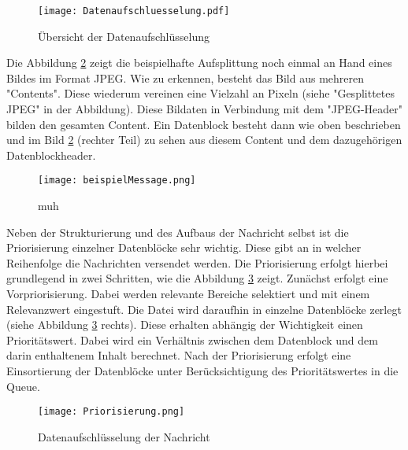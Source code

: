 \begin{figure}[H]
  \centering
  \texttt{[image: Datenaufschluesselung.pdf]}
  \caption{Übersicht der Datenaufschlüsselung}
  \label{fig:uebersichtdatenaufschlüsselung}
\end{figure}

Die Abbildung \ref{fig:beispielJPG} zeigt die beispielhafte Aufsplittung
noch einmal an Hand eines Bildes im Format JPEG. Wie zu erkennen, besteht das Bild aus
mehreren "Contents". Diese wiederum vereinen eine Vielzahl an Pixeln (siehe
"Gesplittetes JPEG" in der Abbildung). Diese Bildaten in Verbindung mit dem
"JPEG-Header" bilden den gesamten Content. Ein Datenblock besteht dann wie oben
beschrieben und im Bild \ref{fig:beispielJPG} (rechter Teil) zu sehen aus diesem
Content und dem dazugehörigen Datenblockheader.

\begin{figure}[H]
	\centering
	\texttt{[image: beispielMessage.png]}
	\caption{muh}
	\label{fig:beispielJPG}
\end{figure}

Neben der Strukturierung und des Aufbaus der Nachricht selbst ist die
Priorisierung einzelner Datenblöcke sehr wichtig. Diese gibt an in welcher
Reihenfolge die Nachrichten versendet werden. Die Priorisierung erfolgt hierbei
grundlegend in zwei Schritten, wie die Abbildung \ref{fig:priorisierungen}
zeigt.
Zunächst erfolgt eine Vorpriorisierung. Dabei werden relevante Bereiche
selektiert und mit einem Relevanzwert eingestuft. Die
Datei wird daraufhin in einzelne Datenblöcke zerlegt (siehe Abbildung
\ref{fig:priorisierungen} rechts). Diese erhalten abhängig der Wichtigkeit einen
Prioritätswert. Dabei wird ein Verhältnis zwischen dem Datenblock und dem darin
enthaltenem Inhalt berechnet. Nach der Priorisierung erfolgt eine Einsortierung
der Datenblöcke unter Berücksichtigung des Prioritätswertes in die Queue.

\begin{figure}[H]
	\centering
	\texttt{[image: Priorisierung.png]}
	\caption{Datenaufschlüsselung der Nachricht}
	\label{fig:priorisierungen}
\end{figure}


